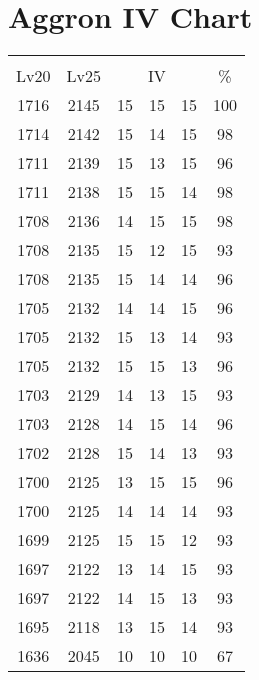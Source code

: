 \documentclass{article}%
\begin{document}
%
\normalsize%
\section{Aggron IV Chart}%
\label{sec:Aggron IV Chart}%
\renewcommand{\arraystretch}{1.5}%
\begin{tabular}{|c|c|c|c|c|c|}%
\hline%
\multicolumn{6}{|c|}{\textcolor{white}{ 
\linebreak{Aggron}
}%
\cellcolor{black}}\\%
\multicolumn{1}{|c}{Lv20}&\multicolumn{1}{c|}{Lv25}&\multicolumn{3}{c|}{IV}&\multicolumn{1}{|c|}{\%}\\%
\hline%
\rowcolor{color100}%
1716&2145&15&15&15&100\\%
\hline%
\rowcolor{color98}%
1714&2142&15&14&15&98\\%
\hline%
\rowcolor{color96}%
1711&2139&15&13&15&96\\%
\hline%
\rowcolor{color98}%
1711&2138&15&15&14&98\\%
\hline%
\rowcolor{color98}%
1708&2136&14&15&15&98\\%
\hline%
\rowcolor{color93}%
1708&2135&15&12&15&93\\%
\hline%
\rowcolor{color96}%
1708&2135&15&14&14&96\\%
\hline%
\rowcolor{color96}%
1705&2132&14&14&15&96\\%
\hline%
\rowcolor{color93}%
1705&2132&15&13&14&93\\%
\hline%
\rowcolor{color96}%
1705&2132&15&15&13&96\\%
\hline%
\rowcolor{color93}%
1703&2129&14&13&15&93\\%
\hline%
\rowcolor{color96}%
1703&2128&14&15&14&96\\%
\hline%
\rowcolor{color93}%
1702&2128&15&14&13&93\\%
\hline%
\rowcolor{color96}%
1700&2125&13&15&15&96\\%
\hline%
\rowcolor{color93}%
1700&2125&14&14&14&93\\%
\hline%
\rowcolor{color93}%
1699&2125&15&15&12&93\\%
\hline%
\rowcolor{color93}%
1697&2122&13&14&15&93\\%
\hline%
\rowcolor{color93}%
1697&2122&14&15&13&93\\%
\hline%
\rowcolor{color93}%
1695&2118&13&15&14&93\\%
\hline%
\rowcolor{color91}%
1636&2045&10&10&10&67\\%
\end{tabular}

%
\end{document}

